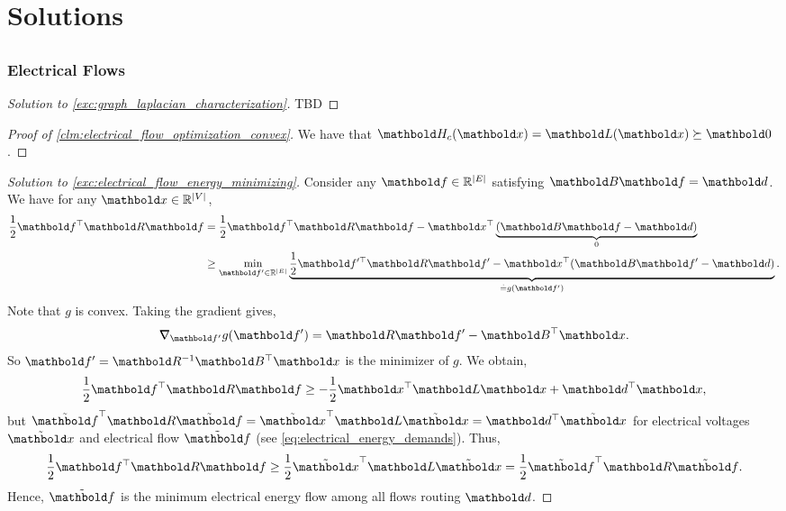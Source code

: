
\chapter{Solutions}

\section{}

\subsection{Electrical Flows}

\begin{proof}[Solution to \cref{exc:graph_laplacian_characterization}] TBD
\end{proof}

\begin{proof}[Proof of \cref{clm:electrical_flow_optimization_convex}] We have that $\mH_c(\vx) = \mL(\vx) \succeq \mZero$.
\end{proof}

\begin{proof}[Solution to \cref{exc:electrical_flow_energy_minimizing}] Consider any $\vf \in \R^{|\sE|}$ satisfying $\mB\vf = \vd$. We have for any $\vx \in \R^{|\sV|}$, \begin{align*}
    \frac{1}{2}\trans{\vf}\mR\vf &= \frac{1}{2}\trans{\vf}\mR\vf - \trans{\vx}\underbrace{(\mB\vf - \vd)}_{0} \\
    &\geq \min_{\vf' \in \R^{|\sE|}} \underbrace{\frac{1}{2}\trans{\vf'}\mR\vf' - \trans{\vx}(\mB\vf' - \vd)}_{\eqdef g(\vf')}.
\end{align*} Note that $g$ is convex. Taking the gradient gives, \begin{align*}
    \grad_{\vf'} g(\vf') = \mR\vf' - \trans{\mB}\vx.
\end{align*} So $\vf' = \inv{\mR}\trans{\mB}\vx$ is the minimizer of $g$. We obtain, \begin{align*}
    \frac{1}{2}\trans{\vf}\mR\vf \geq -\frac{1}{2}\trans{\vx}\mL\vx + \trans{\vd}\vx,
\end{align*} but $\trans{\Tilde{\vf}}\mR\Tilde{\vf} = \trans{\Tilde{\vx}}\mL\Tilde{\vx} = \trans{\vd}\Tilde{\vx}$ for electrical voltages $\Tilde{\vx}$ and electrical flow $\Tilde{\vf}$ (see \cref{eq:electrical_energy_demands}). Thus, \begin{align*}
    \frac{1}{2}\trans{\vf}\mR\vf \geq \frac{1}{2}\trans{\Tilde{\vx}}\mL\Tilde{\vx} = \frac{1}{2}\trans{\Tilde{\vf}}\mR\Tilde{\vf}.
\end{align*} Hence, $\Tilde{\vf}$ is the minimum electrical energy flow among all flows routing $\vd$.
\end{proof}

